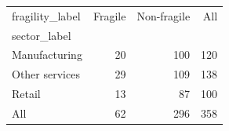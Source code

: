 \begin{tabular}{lrrr}
\toprule
fragility_label & Fragile & Non-fragile & All \\
sector_label &  &  &  \\
\midrule
Manufacturing & 20 & 100 & 120 \\
Other services & 29 & 109 & 138 \\
Retail & 13 & 87 & 100 \\
All & 62 & 296 & 358 \\
\bottomrule
\end{tabular}
